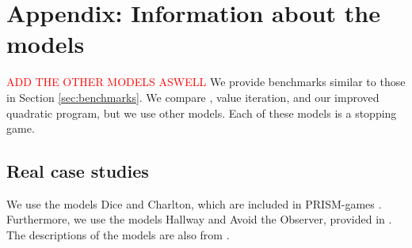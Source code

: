 \chapter{Appendix: Information about the models} \label{sec:appendix}
\textcolor{red}{ADD THE OTHER MODELS ASWELL}
We provide benchmarks similar to those in Section \ref{sec:benchmarks}. We compare \conQP{}, value iteration, and our improved quadratic program, but we use other models. Each of these models is a stopping game.
\section*{Real case studies}
We use the models Dice \cite{dice} and Charlton\cite{charlton}, which are included in PRISM-games \cite{PRISM-games}. Furthermore, we use the models Hallway and Avoid the Observer, provided in \cite{cav20}. The descriptions of the models are also from \cite{cav20}.
